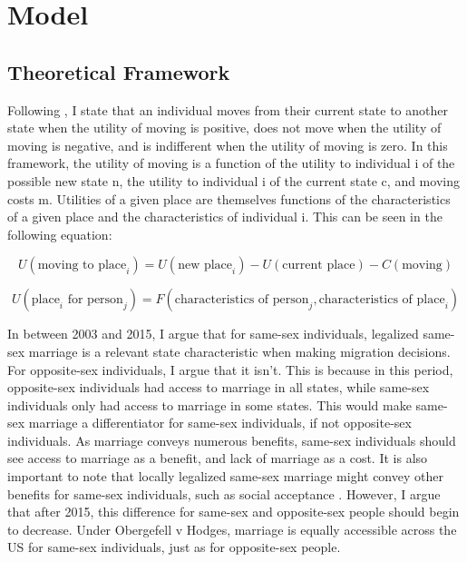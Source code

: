 \documentclass[12pt,letterpaper]{article}
\begin{document}
\section{Model}
\subsection{Theoretical Framework}
Following \citet{1, 12, 18}, I state that an individual moves from their current state to another state when the utility of moving is positive, does not move when the utility of moving is negative, and is indifferent when the utility of moving is zero. In this framework, the utility of moving is a function of the utility to individual i of the possible new state n, the utility to individual i of the current state c, and moving costs m. Utilities of a given place are themselves functions of the characteristics of a given place and the characteristics of individual i. This can be seen in the following equation: 

\begin{equation}
U(\text{moving to place}_i) = U(\text{new place}_i) - U(\text{current place}) - C(\text{moving})
\end{equation}

\begin{equation}
U(\text{place}_i \text{ for person}_j) = F(\text{characteristics of person}_j, \text{characteristics of place}_i)
\end{equation}


In between 2003 and 2015, I argue that for same-sex individuals, legalized same-sex marriage is a relevant state characteristic when making migration decisions. For opposite-sex individuals, I argue that it isn’t. This is because in this period, opposite-sex individuals had access to marriage in all states, while same-sex individuals only had access to marriage in some states. This would make same-sex marriage a differentiator for same-sex individuals, if not opposite-sex individuals. As marriage conveys numerous benefits, same-sex individuals should see access to marriage as a benefit, and lack of marriage as a cost. It is also important to note that locally legalized same-sex marriage might convey other benefits for same-sex individuals, such as social acceptance \citep{12}. However, I argue that after 2015, this difference for same-sex and opposite-sex people should begin to decrease. Under Obergefell v Hodges, marriage is equally accessible across the US for same-sex individuals, just as for opposite-sex people. 
\end{document}
